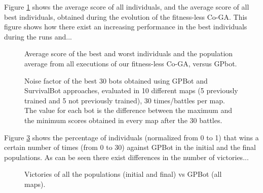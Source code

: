 \documentclass[conference]{IEEEtran}
\begin{document}

Figure \ref{figura:convergence} shows the average score of all individuals, and the average score of all best individuals, obtained during the evolution of the fitness-less Co-GA.
This figure shows how there exist an increasing performance in the best individuals during the runs and...

\begin{figure}[htb]
\tiny
\begin{center}
\end{center}
\caption{Average score of the best and worst individuals and the
  population average from all executions of our fitness-less Co-GA,
  versus GPbot.} %
\label{figura:convergence}
\end{figure}


\begin{figure}[htb]
\tiny
\begin{center}
\end{center}
\caption{Noise factor of the best 30 bots obtained using GPBot and SurvivalBot approaches, evaluated in 10 different maps (5 previously trained and 5 not previously trained), 30 times/battles per map. The value for each bot is the difference between the maximum and the minimum scores obtained in every map after the 30 battles.}
\label{figura:noise}
\end{figure}


Figure \ref{figura:Victories_VS_GPBot_AllMaps} shows the percentage of individuals (normalized  from 0 to 1) that wins a certain number of times (from 0 to 30) against GPBot in the initial and the final populations. As can be seen there exist differences in the number of victories...

\begin{figure}[htb]
\tiny
\begin{center}
\end{center}
\caption{Victories of all the populations (initial and final) vs GPBot (all maps).}
\label{figura:Victories_VS_GPBot_AllMaps}
\end{figure}
\end{document}
